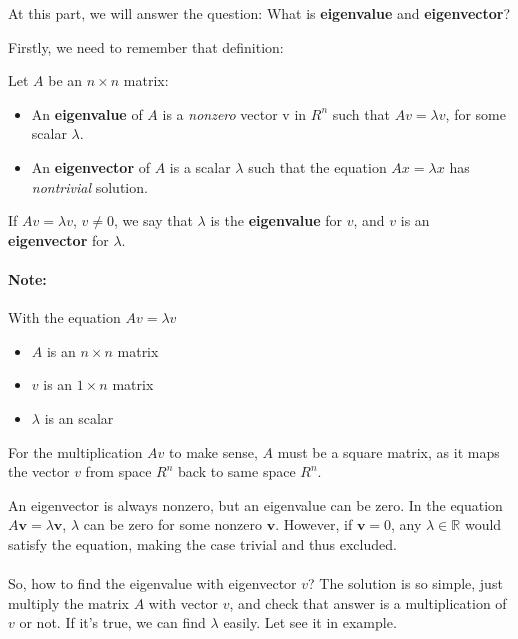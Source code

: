 \documentclass[a4paper,12pt]{article}
\begin{document}
\begin{frame}
    

\small


\small At this part, we will answer the question: What is \textbf{eigenvalue} and \textbf{eigenvector}?

Firstly, we need to remember that definition:


\begin{tcolorbox}[title=Definition,colframe=blue!70!black, colback=blue!5!white]
Let \(A\) be an \(n \times n\) matrix:
\begin{itemize}
    \item An \textbf{eigenvalue} of \(A\) is a \textit{nonzero} vector v in \(R^n\) such that \(Av=\lambda v\), for some scalar \(\lambda\).
    \item An \textbf{eigenvector} of \(A\) is a scalar \(\lambda\) such that the equation \(Ax =  \lambda x\)  has \textit{nontrivial} solution.
\end{itemize}

    If \(Av = \lambda v\), \(v \neq 0\), we say that \(\lambda\) is the \textbf{eigenvalue} for \(v\), and \(v\) is an \textbf{eigenvector} for \(\lambda\).
\end{tcolorbox}
\paragraph{Note:}
    With the equation \(Av = \lambda v\)
    \begin{itemize}
        \item \(A\) is an \(n \times n\) matrix
        \item \(v\) is an \(1 \times n\) matrix
        \item \(\lambda\) is an scalar
    \end{itemize}

    For the multiplication \(Av\) to make sense, \(A\) must be a square matrix, as it maps the vector \(v\) from space \(R^n\) back to same space \(R^n\).

    An eigenvector is always nonzero, but an eigenvalue can be zero. In the equation \(A\mathbf{v} = \lambda \mathbf{v}\), \(\lambda\) can be zero for some nonzero \(\mathbf{v}\). However, if \(\mathbf{v} = 0\), any \(\lambda \in \mathbb{R}\) would satisfy the equation, making the case trivial and thus excluded.

    \paragraph{} So, how to find the eigenvalue with eigenvector \(v\)? The solution is so simple, just multiply the matrix \(A\) with vector \(v\), and check that answer is a multiplication of \(v\) or not. If it's true, we can find \(\lambda\) easily. Let see it in example. 


\end{frame}
\end{document}
